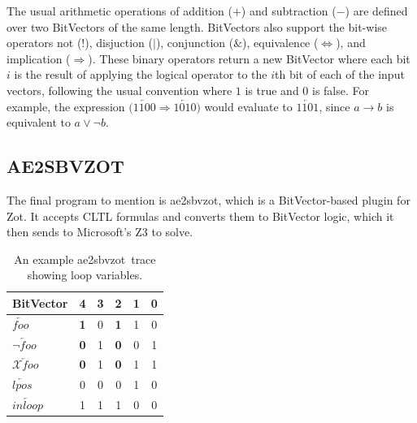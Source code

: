 \documentclass[a4paper,12pt]{article}
\newcommand*\BitAnd{\mathbin{\&}}
\newcommand*\BitOr{\mathbin{|}}
\newcommand{\BitNeg}{!}
\newcommand{\aez}{ae2sbvzot}
\begin{document}
The usual arithmetic operations of addition (\(+\)) and subtraction (\(-\)) are
defined over two BitVectors of the same length. BitVectors also support the
bit-wise operators not (\(\BitNeg\)), disjuction (\(\BitOr\)), conjunction (\(\BitAnd\)),
equivalence (\(\iff\)), and implication (\(\Rightarrow\)). These binary operators return a
new BitVector where each bit \(i\) is the result of applying the logical
operator to the \(i\)th bit of each of the input vectors, following the usual
convention where \(1\) is true and \(0\) is false. For example, the expression
\(\big( \overleftarrow{1100} \Rightarrow \overleftarrow{1010} \big) \) would
evaluate to \(\overleftarrow{1101}\), since \(a \rightarrow b\) is equivalent to
\(a \lor \neg b\).


\subsection{AE2SBVZOT}\label{zot-encoding}

The final program to mention is \aez, which is a BitVector-based plugin for Zot.
It accepts CLTL formulas and converts them to BitVector logic, which it then
sends to Microsoft's Z3 to solve.

\begin{table}
  \centering
  \caption{An example \aez\ trace showing loop variables.}
  \begin{tabular}{l|c c c c c}
    BitVector & \textbf{4} & 3 & \textbf{2} & 1 & 0 \\
    \midrule
    \(\overleftarrow{foo}\)            & \textbf{1} & 0 & \textbf{1} & 1 & 0 \\
    \(\overleftarrow{\neg foo}\)       & \textbf{0} & 1 & \textbf{0} & 0 & 1 \\
    \(\overleftarrow{\mathcal{X}foo}\) & \textbf{0} & 1 & \textbf{0} & 1 & 1 \\

    \midrule
    \(\overleftarrow{lpos}\)           & 0 & 0 & 0 & 1 & 0 \\
    \(\overleftarrow{inloop}\)         & 1 & 1 & 1 & 0 & 0

  \end{tabular}
  \label{table:zotloop}
 \end{table}
\end{document}
